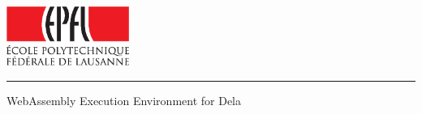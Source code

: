 
%        




\newcommand{\logoepfl}[0]{
  \begin{center}
    \includegraphics[width=4cm]{logo_epfl_coul.eps}
  \end{center}
  \vspace{0.3cm}
  \hrule
}
\newcommand{\project}[1]{
  \begin{center}
    \large{#1}
  \end{center}
  \vspace{1cm}
}
\newcommand{\department}[1]{
  \begin{center}
    \large{#1}
  \end{center}
}
\newcommand{\lab}[1]{
  \begin{center}
    \large{#1}
  \end{center}
}
\newcommand{\supervisor}[3]{
  \begin{center}
    \begin{normalsize}{
        \bf #1}\\#2\\#3
    \end{normalsize}
  \end{center}
}
\renewcommand{\author}[1]{
  \begin{center}
    \Large{#1}
  \end{center}
  \vspace{0.5cm}
}
\renewcommand{\title}[1]{
  \vspace{3cm}
  \begin{center}
    \huge{#1}
  \end{center}
  \vspace{1.7cm}
}
\renewcommand{\date}[2]{
  \begin{center}
    \normalsize{#1 #2}
  \end{center}
  \vspace{0.5cm}
}


\thispagestyle{empty}


  \logoepfl
  
  \title{WebAssembly Execution Environment for Dela
}
  
